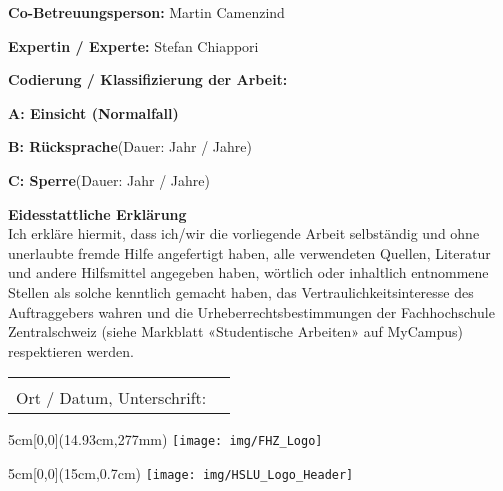 \vspace{0.6cm}
\noindent
\textbf{Co-Betreuungsperson:} Martin Camenzind

\vspace{0.6cm}
\noindent
\textbf{Expertin / Experte:} Stefan Chiappori

\vspace{0.6cm}
\noindent
\textbf{Codierung / Klassifizierung der Arbeit:}

\begin{todolist}
	\item[\xmark]\textbf{A: Einsicht (Normalfall)}
	\item \textbf{B: Rücksprache}\hspace*{0.7cm}(Dauer:\hspace*{1cm} Jahr / Jahre)
	\item \textbf{C: Sperre}\hspace*{1.865cm}(Dauer:\hspace*{1cm} Jahr / Jahre)
\end{todolist}

\vfill

\noindent
\textbf{Eidesstattliche Erklärung}
\\
Ich erkläre hiermit, dass ich/wir die vorliegende Arbeit selbständig und ohne unerlaubte fremde Hilfe angefertigt haben, alle verwendeten Quellen, Literatur und andere Hilfsmittel angegeben haben, wörtlich oder inhaltlich entnommene Stellen als solche kenntlich gemacht haben, das Vertraulichkeitsinteresse des Auftraggebers wahren und die Urheberrechtsbestimmungen der Fachhochschule Zentralschweiz (siehe Markblatt «Studentische Arbeiten» auf MyCampus) respektieren werden.

\vspace{1em}

\noindent
\begin{tabularx}{\textwidth}{@{}lX}
	&\\
	Ort / Datum, Unterschrift: &  \\
	\cline{2-2}
\end{tabularx}

\begin{textblock*}{5cm}[0,0](14.93cm,277mm)
	\texttt{[image: img/FHZ\_Logo]}
\end{textblock*}

\newpage

\begin{textblock*}{5cm}[0,0](15cm,0.7cm)
	\texttt{[image: img/HSLU\_Logo\_Header]}
\end{textblock*}

